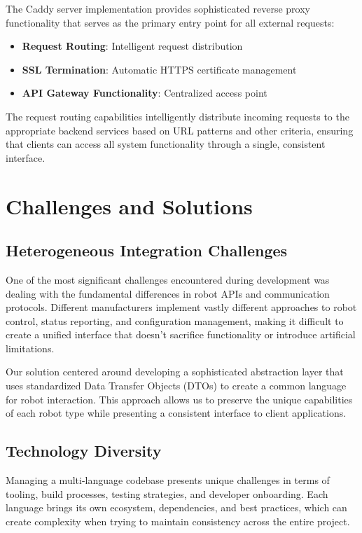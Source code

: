 \documentclass[runningheads]{llncs}
\begin{document}
The Caddy server implementation provides sophisticated reverse proxy functionality that serves as the primary entry point for all external requests:

\begin{itemize}
    \item \textbf{Request Routing}: Intelligent request distribution
    \item \textbf{SSL Termination}: Automatic HTTPS certificate management
    \item \textbf{API Gateway Functionality}: Centralized access point
\end{itemize}

The request routing capabilities intelligently distribute incoming requests to the appropriate backend services based on URL patterns and other criteria, ensuring that clients can access all system functionality through a single, consistent interface.

\section{Challenges and Solutions}

\subsection{Heterogeneous Integration Challenges}

One of the most significant challenges encountered during development was dealing with the fundamental differences in robot APIs and communication protocols. Different manufacturers implement vastly different approaches to robot control, status reporting, and configuration management, making it difficult to create a unified interface that doesn't sacrifice functionality or introduce artificial limitations.

Our solution centered around developing a sophisticated abstraction layer that uses standardized Data Transfer Objects (DTOs) to create a common language for robot interaction. This approach allows us to preserve the unique capabilities of each robot type while presenting a consistent interface to client applications.

\subsection{Technology Diversity}

Managing a multi-language codebase presents unique challenges in terms of tooling, build processes, testing strategies, and developer onboarding. Each language brings its own ecosystem, dependencies, and best practices, which can create complexity when trying to maintain consistency across the entire project.
\end{document}
